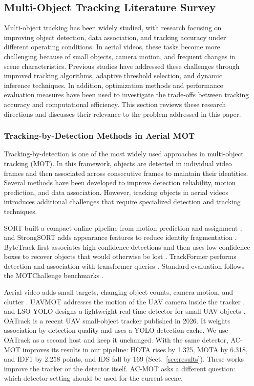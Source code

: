 \documentclass[pdflatex,sn-mathphys-num,iicol]{sn-jnl}
\begin{document}
\subsection{Multi-Object Tracking Literature Survey}
Multi-object tracking has been widely studied, with research focusing on improving object detection, data association, and tracking accuracy under different operating conditions. In aerial videos, these tasks become more challenging because of small objects, camera motion, and frequent changes in scene characteristics. Previous studies have addressed these challenges through improved tracking algorithms, adaptive threshold selection, and dynamic inference techniques. In addition, optimization methods and performance evaluation measures have been used to investigate the trade-offs between tracking accuracy and computational efficiency. This section reviews these research directions and discusses their relevance to the problem addressed in this paper.

\subsubsection{Tracking-by-Detection Methods in Aerial MOT}\label{sec:hosts}
Tracking-by-detection is one of the most widely used approaches in multi-object tracking (MOT). In this framework, objects are detected in individual video frames and then associated across consecutive frames to maintain their identities. Several methods have been developed to improve detection reliability, motion prediction, and data association. However, tracking objects in aerial videos introduces additional challenges that require specialized detection and tracking techniques.

SORT built a compact online pipeline from motion prediction and assignment
\cite{bewley2016sort}, and StrongSORT adds appearance features to reduce
identity fragmentation \cite{du2023strongsort}. ByteTrack first associates
high-confidence detections and then uses low-confidence boxes to recover
objects that would otherwise be lost \cite{zhang2022bytetrack}. TrackFormer
performs detection and association with transformer queries
\cite{meinhardt2022trackformer}. Standard evaluation follows the MOTChallenge
benchmarks \cite{dendorfer2021motchallenge}.

Aerial video adds small targets, changing object counts, camera motion, and
clutter \cite{zhu2022visdrone,du2018uavdt}. UAVMOT addresses the motion of the
UAV camera inside the tracker \cite{liu2022uavmot}, and LSO-YOLO designs a
lightweight real-time detector for small UAV objects \cite{dai2026lsoyolo}.
OATrack \cite{qi2026oatrack} is a recent UAV small-object tracker published in
2026. It weights association by detection quality and uses a YOLO detection
cache. We use OATrack as a second host and keep it unchanged. With the same
detector, AC-MOT improves its results in our pipeline: HOTA rises by 1.325,
MOTA by 6.318, and IDF1 by 2.258 points, and IDS fall by 169
(Sect.~\ref{sec:results}). These works improve the tracker or the detector
itself. AC-MOT asks a different question: which detector setting should be
used for the current scene.
\end{document}
